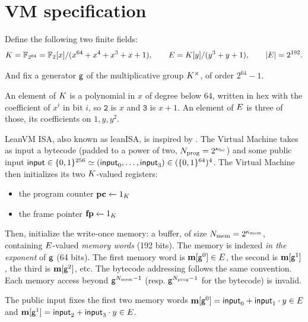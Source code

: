 \section{VM specification}\label{sec:vm}

Define the following two finite fields:
\[
  K=\mathbb{F}_{2^{64}}=\mathbb{F}_2[x]/(x^{64}+x^4+x^3+x+1),
  \qquad
  E=K[y]/(y^3+y+1),
  \qquad |E|=2^{192}.
\]

And fix a generator $\mathsf{g}$ of the multiplicative group $K^{\times}$, of order $2^{64}-1$.

An element of $K$ is a polynomial in $x$ of degree below $64$, written in hex with the coefficient of $x^{i}$ in bit $i$, so $\mathtt{2}$ is $x$ and $\mathtt{3}$ is $x+1$. An element of $E$ is three of those, its coefficients on $1,y,y^{2}$.

\vspace{5mm}

LeanVM ISA, also known as leanISA, is inspired by \cite{cairo}. The Virtual Machine takes as input a bytecode (padded to a power of two, $N_{\mathrm{prog}} = 2^{\kappa_{\mathrm{bc}}}$) and some public input $\textsf{input} \in \{0,1\}^{256} \simeq (\textsf{input}_0, \dots, \textsf{input}_3) \in (\{0,1\}^{64})^4$. The Virtual Machine then initializes its two $K$-valued registers:
\begin{itemize}
  \item the program counter $\mathbf{pc} \xleftarrow{} 1_K$
  \item the frame pointer $\mathbf{fp} \xleftarrow{} 1_K$
\end{itemize}

Then, initialize the write-once memory: a buffer, of size $N_{\mathrm{mem}} = 2^{\kappa_{\mathrm{mem}}}$, containing $E$-valued \textit{memory words} (192 bits). The memory is indexed \textit{in the exponent} of $\mathsf{g}$ (64 bits). The first memory word is $\mathbf{m}[\mathsf{g}^0] \in E$, the second is $\mathbf{m}[\mathsf{g}^1]$, the third is $\mathbf{m}[\mathsf{g}^2]$, etc. The bytecode addressing follows the same convention. Each memory access beyond $\mathsf{g}^{N_{\mathrm{mem}} - 1}$ (resp. $\mathsf{g}^{N_{\mathrm{prog}} - 1}$ for the bytecode) is invalid.

The public input fixes the first two memory words $\mathbf{m}[\mathsf{g}^0] = \textsf{input}_0 + \textsf{input}_1 \cdot y \in E$ and $\mathbf{m}[\mathsf{g}^1] = \textsf{input}_2 + \textsf{input}_3 \cdot y \in E$.

